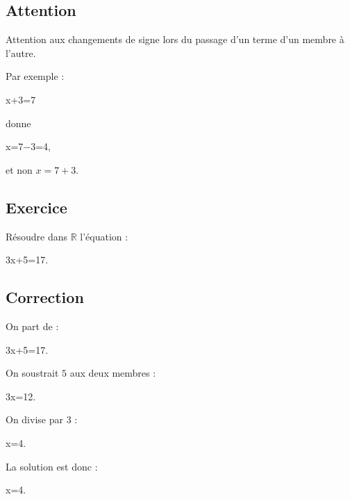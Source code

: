 
\subsection{Attention}

\begin{attentionbox}
Attention aux changements de signe lors du passage d'un terme d'un membre à l'autre.

Par exemple :

x+3=7

donne

x=7−3=4,

et non $x=7+3$.
\end{attentionbox}


\subsection{Exercice}

\begin{exercicebox}
Résoudre dans $\mathbb{R}$ l'équation :

3x+5=17.

\end{exercicebox}


\subsection{Correction}

\begin{correctionbox}
On part de :

3x+5=17.

On soustrait $5$ aux deux membres :

3x=12.

On divise par $3$ :

x=4.

La solution est donc :

x=4.

\end{correctionbox}
